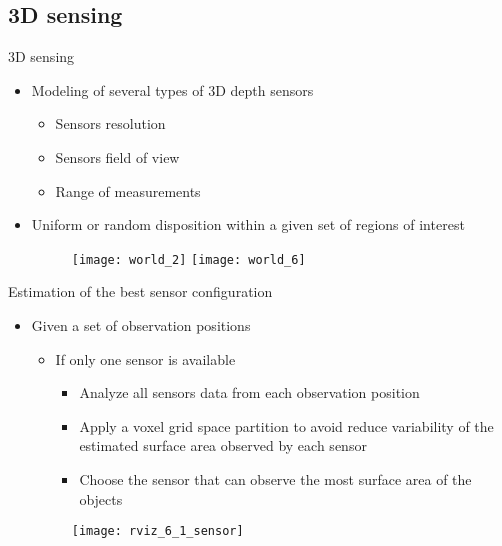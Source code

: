 \subsection*{3D sensing}
\begin{frame}{3D sensing}
		\begin{itemize}
			\item Modeling of several types of 3D depth sensors
			\begin{itemize}
				\item Sensors resolution
				\item Sensors field of view
				\item Range of measurements
			\end{itemize}
			\item Uniform or random disposition within a given set of regions of interest
			\begin{figure}[!ht]
				\centering
				\texttt{[image: world\_2]}
				\texttt{[image: world\_6]}
			\end{figure}
		\end{itemize}
\end{frame}

\begin{frame}{Estimation of the best sensor configuration}
	\begin{itemize}
		\item Given a set of observation positions
		\begin{itemize}
			\item If only one sensor is available
			\begin{itemize}
				\item Analyze all sensors data from each observation position
				\item Apply a voxel grid space partition to avoid reduce variability of the estimated surface area observed by each sensor
				\item Choose the sensor that can observe the most surface area of the objects
			\end{itemize}
		\end{itemize}
		\begin{figure}[!ht]
			\centering
			\texttt{[image: rviz\_6\_1\_sensor]}
		\end{figure}
	\end{itemize}
\end{frame}

